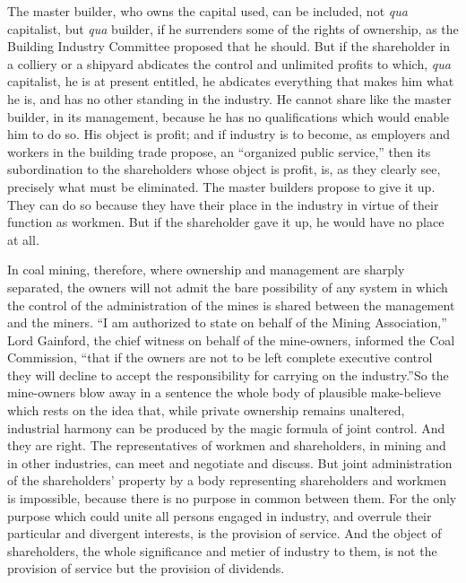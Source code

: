 \documentclass{book}
\begin{document}
The master builder, who owns the capital used, can be included, not \emph{qua} capitalist, but \emph{qua} builder, if he surrenders some of the rights of ownership, as the Building Industry Committee proposed that he should. But if the shareholder in a colliery or a shipyard abdicates the control and unlimited profits to which, \emph{qua} capitalist, he is at present entitled, he abdicates everything that makes him what he is, and has no other standing in the industry. He cannot share like the master builder, in its management, because he has no qualifications which would enable him to do so. His object is profit; and if industry is to become, as employers and workers in the building trade propose, an “organized public service,” then its subordination to the shareholders whose object is profit, is, as they clearly see, precisely what must be eliminated. The master builders propose to give it up. They can do so because they have their place in the industry in virtue of their function as workmen. But if the shareholder gave it up, he would have no place at all.

In coal mining, therefore, where ownership and management are sharply separated, the owners will not admit the bare possibility of any system in which the control of the administration of the mines is shared between the management and the miners. “I am authorized to state on behalf of the Mining Association,” Lord Gainford, the chief witness on behalf of the mine-owners, informed the Coal Commission, “that if the owners are not to be left complete executive control they will decline to accept the responsibility for carrying on the industry.”\footnotemark[2] So the mine-owners blow away in a sentence the whole body of plausible make-believe which rests on the idea that, while private ownership remains unaltered, industrial harmony can be produced by the magic formula of joint control. And they are right. The representatives of workmen and shareholders, in mining and in other industries, can meet and negotiate and discuss. But joint administration of the shareholders’ property by a body representing shareholders and workmen is impossible, because there is no purpose in common between them. For the only purpose which could unite all persons engaged in industry, and overrule their particular and divergent interests, is the provision of service. And the object of shareholders, the whole significance and metier of industry to them, is not the provision of service but the provision of dividends.
\end{document}
